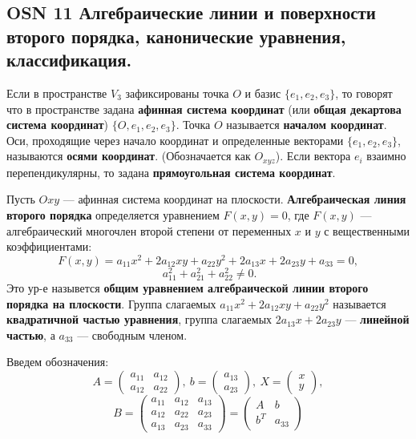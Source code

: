 \subsection{OSN 11 Алгебраические линии и поверхности второго порядка, канонические уравнения,  классификация.}

Если в пространстве $V_3$ зафиксированы точка $O$ и базис $\{e_1, e_2, e_3\}$, то говорят что в пространстве задана \textbf{афинная система координат} (или \textbf{общая декартова система координат}) $\{O, e_1, e_2, e_3\}$. Точка $O$ называется \textbf{началом координат}. Оси, проходящие через начало координат и определенные векторами $\{e_1, e_2, e_3\}$, называются \textbf{осями координат}. (Обозначается как $O_{xyz}$). Если вектора $e_i$ взаимно перепендикулярны, то задана \textbf{прямоугольная система координат}.

\bigbreak

Пусть $Oxy$ --- афинная система координат на плоскости. \textbf{Алгебраическая линия второго порядка} определяется уравнением $F(x, y) = 0$, где $F(x, y)$ --- алгебраический многочлен второй степени от переменных $x$ и $y$ с вещественными коэффициентами:
$$F(x,y)=a_{11}x^2 +2a_{12}xy+a_{22}y^2 +2a_{13}x+2a_{23}y+a_{33} =0,$$
$$~a_{11}^2 + a_{21}^2 + a_{22}^2\neq 0.$$
Это ур-е назывется \textbf{общим уравнением алгебраической линии второго порядка на плоскости}. Группа слагаемых $a_{11}x^2 + 2a_{12}xy + a_{22}y^2$ называется \textbf{квадратичной частью уравнения}, группа слагаемых $2a_{13}x + 2a_{23}y$ --- \textbf{линейной частью}, а $a_{33}$ --- свободным членом.

Введем обозначения:
$$A = \begin{pmatrix} a_{11} & a_{12} \\a_{12} & a_{22}\end{pmatrix},~ b=\begin{pmatrix} a_{13} \\ a_{23} \end{pmatrix},~ X=\begin{pmatrix}x \\ y\end{pmatrix},$$
$$B = \begin{pmatrix} a_{11} & a_{12} & a_{13} \\a_{12} & a_{22} & a_{23} \\ a_{13} & a_{23} & a_{33}\end{pmatrix} = \begin{pmatrix} A & b \\ b^T & a_{33}\end{pmatrix}$$

